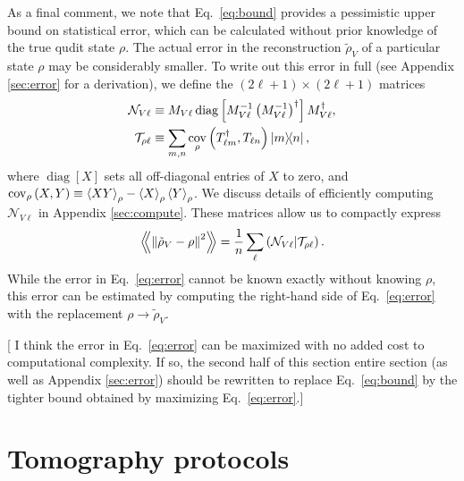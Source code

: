\documentclass[notitlepage,twocolumn]{revtex4-2}
\newcommand{\f}[2]{\dfrac{#1}{#2}} %
\newcommand{\p}[1]{\left(#1\right)} %
\renewcommand{\sp}[1]{\left[#1\right]} %
\newcommand{\bk}{\Braket} %
\newcommand{\Bbk}[1]
{\left\langle\!\!\left\langle #1 \right\rangle\!\!\right\rangle}
\newcommand{\N}{\mathcal{N}}
\newcommand{\T}{\mathcal{T}}
\DeclareMathOperator{\cov}{cov}
\DeclareMathOperator{\diag}{diag}
\newcommand{\red}[1]{{\color{red} #1}}
\begin{document}
As a final comment, we note that Eq.~\eqref{eq:bound} provides a pessimistic upper bound on statistical error, which can be calculated without prior knowledge of the true qudit state $\rho$.
The actual error in the reconstruction $\tilde\rho_V$ of a particular state $\rho$ may be considerably smaller.
To write out this error in full (see Appendix \ref{sec:error} for a derivation), we define the $\p{2\ell+1}\times\p{2\ell+1}$ matrices
\begin{align}
  \N_{V\ell} &\equiv M_{V\ell}
  \diag\sp{M_{V\ell}^{-1} \p{M_{V\ell}^{-1}}^\dag} M_{V\ell}^\dag, \\
  \T_{\rho\ell} &\equiv \sum_{m,n}
  \cov_\rho\p{T_{\ell m}^\dag, T_{\ell n}} \op{m}{n},
\end{align}
where $\diag\sp{X}$ sets all off-diagonal entries of $X$ to zero, and $\cov_\rho\p{X,Y} \equiv \bk{XY}_\rho - \bk{X}_\rho \bk{Y}_\rho$.
We discuss details of efficiently computing $\N_{V\ell}$ in Appendix \ref{sec:compute}.
These matrices allow us to compactly express
\begin{align}
  \Bbk{\norm{\tilde\rho_V-\rho}^2}
  = \f1n \sum_\ell \p{\N_{V\ell}|\T_{\rho\ell}}.
  \label{eq:error}
\end{align}
While the error in Eq.~\eqref{eq:error} cannot be known exactly without knowing $\rho$, this error can be estimated by computing the right-hand side of Eq.~\eqref{eq:error} with the replacement $\rho\to\tilde\rho_V$.

[\red{I think the error in Eq.~\eqref{eq:error} can be maximized with no added cost to computational complexity.
  If so, the second half of this section entire section (as well as Appendix \ref{sec:error}) should be rewritten to replace Eq.~\eqref{eq:bound} by the tighter bound obtained by maximizing Eq.~\eqref{eq:error}.}]

\section{Tomography protocols}
\label{sec:protocol}
\end{document}

